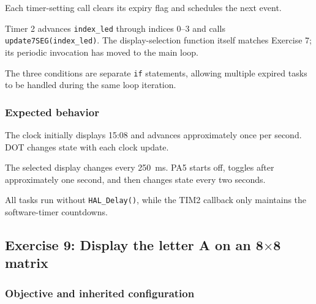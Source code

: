 \documentclass[a4paper]{article}
\begin{document}
Each timer-setting call clears its expiry
flag and schedules the next event.

Timer 2 advances \texttt{index\_led}
through indices 0--3 and calls
\texttt{update7SEG(index\_led)}.
The display-selection function itself
matches Exercise 7; its periodic invocation
has moved to the main loop.

The three conditions are separate
\texttt{if} statements, allowing multiple
expired tasks to be handled during the
same loop iteration.

\subsubsection{Expected behavior}

The clock initially displays 15:08 and
advances approximately once per second.
DOT changes state with each clock update.

The selected display changes every 250~ms.
PA5 starts off, toggles after approximately
one second, and then changes state every
two seconds.

All tasks run without \texttt{HAL\_Delay()},
while the TIM2 callback only maintains
the software-timer countdowns.


%

%

\subsection{Exercise 9: Display the letter A on an
8\texorpdfstring{$\times$}{x}8 matrix}

\subsubsection{Objective and inherited configuration}
\end{document}
